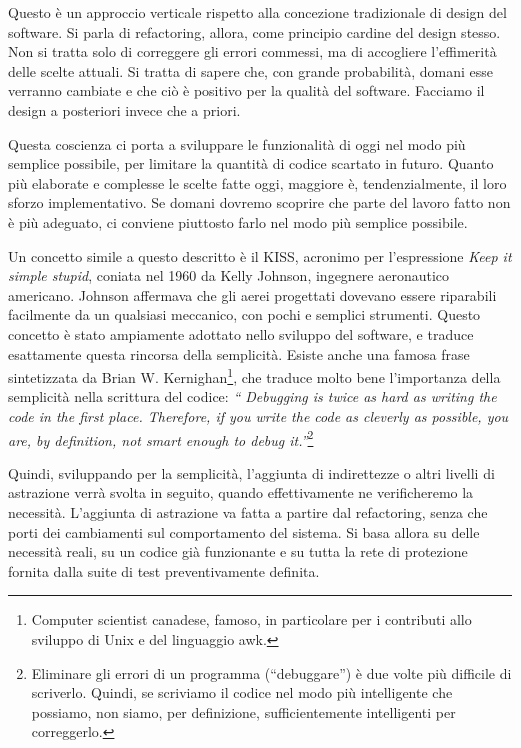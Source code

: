 \documentclass[12pt]{report}
\begin{document}
Questo è un approccio verticale rispetto alla
concezione tradizionale di design del software.
Si parla di refactoring, allora, come principio cardine del
design stesso. Non si tratta solo di correggere gli errori commessi, ma di
accogliere l'effimerità delle scelte attuali. Si tratta di sapere che, con grande
probabilità, domani esse verranno cambiate e che ciò è positivo per la
qualità del software. Facciamo il design a posteriori invece che a priori.

Questa coscienza ci porta a sviluppare le funzionalità di oggi nel modo
più semplice possibile, per limitare la quantità di codice scartato in futuro. 
Quanto più elaborate e complesse le scelte fatte oggi,
maggiore è, tendenzialmente, il loro sforzo implementativo. Se domani 
dovremo scoprire che parte del lavoro fatto non è più adeguato, ci conviene
piuttosto farlo nel modo più semplice possibile. 

Un concetto simile a questo descritto è il KISS, acronimo per l'espressione
\textit{Keep it simple stupid}, coniata nel 1960 da Kelly Johnson, ingegnere
aeronautico americano. Johnson affermava che gli aerei progettati 
dovevano essere riparabili facilmente da un qualsiasi meccanico,
con pochi e semplici strumenti. Questo concetto è stato ampiamente 
adottato nello sviluppo del software, e traduce esattamente 
questa rincorsa della semplicità.
Esiste anche una famosa frase sintetizzata da Brian W. Kernighan\footnote{
Computer scientist canadese, famoso, in particolare per i contributi allo
sviluppo di Unix e del linguaggio awk.}, che traduce
molto bene l'importanza della semplicità nella scrittura del codice: 
\textit{``
Debugging is twice as hard as writing the code in the first place. 
Therefore, if you write the code as cleverly as possible, you are, 
by definition, not smart enough to debug it.''}\footnote{
	Eliminare gli errori di un programma (``debuggare'') è due volte più
	difficile di scriverlo. Quindi, se scriviamo il codice nel modo più 
	intelligente che possiamo, non siamo, per definizione, sufficientemente 
	intelligenti per correggerlo.
}

Quindi, sviluppando per la semplicità, l'aggiunta di indirettezze 
o altri livelli di astrazione verrà 
svolta in seguito, quando effettivamente ne verificheremo la necessità. 
L'aggiunta di astrazione va fatta a partire dal refactoring, 
senza che porti dei cambiamenti sul comportamento del
sistema. Si basa allora su delle necessità reali, su un codice già
funzionante e su tutta la rete di protezione fornita dalla suite di 
test preventivamente definita. 
\end{document}
